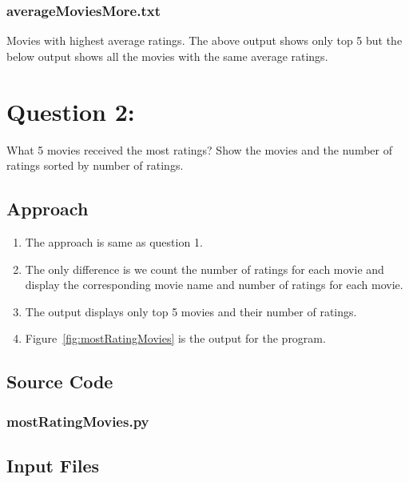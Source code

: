 \documentclass[12pt]{article}
\begin{document}
\subsubsection{averageMoviesMore.txt}
Movies with highest average ratings. The above output shows only top 5 but the below output shows all the movies with the same average ratings.

\newpage
\section{Question 2:}
What 5 movies received the most ratings? Show the movies and
the number of ratings sorted by number of ratings.
\subsection{Approach}
\begin{enumerate}
    \item The approach is same as question 1. 
    \item The only difference is we count the number of ratings for each movie and display the corresponding movie name and number of ratings for each movie.
    \item The output displays only top 5 movies and their number of ratings. 
    \item Figure~\ref{fig:mostRatingMovies} is the output for the program.
\end{enumerate}


\newpage
\subsection{Source Code}
\subsubsection{mostRatingMovies.py}

\newpage

\subsection{Input Files}
\end{document}
